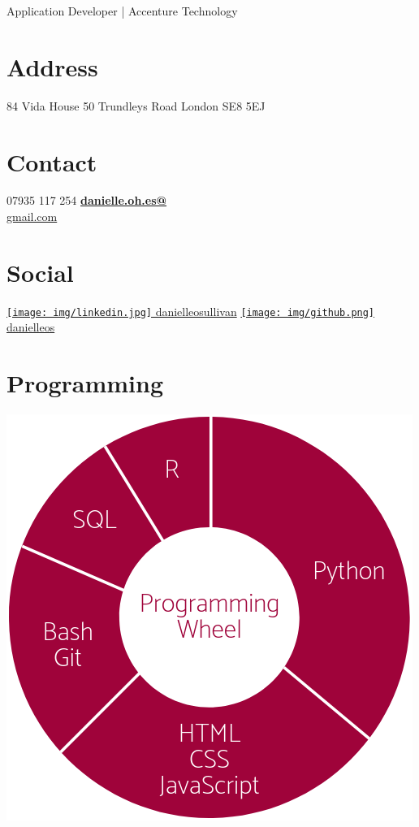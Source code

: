 \documentclass[]{friggeri-cv}
\begin{document}
      {\-\hspace{1.5cm} Application Developer | Accenture Technology}
      

\begin{aside}

    \section{Address}
        84 Vida House
        50 Trundleys Road
        London
        SE8 5EJ
    ~
    \section{Contact}
        07935 117 254
        \href{mailto:danielle.osullivan@accenture.com}{\textbf{danielle.oh.es@}\\gmail.com}
    ~
    \section{Social}
        \href{https://www.linkedin.com/in/danielleosullivan}{\texttt{[image: img/linkedin.jpg]} danielleosullivan}
        \href{https://github.com/danielleos}{\texttt{[image: img/github.png]} danielleos}
    ~
    \section{Programming}
        \includegraphics[scale=0.15]{img/programmingwheel.png}
    ~


\end{aside}
\end{document}
